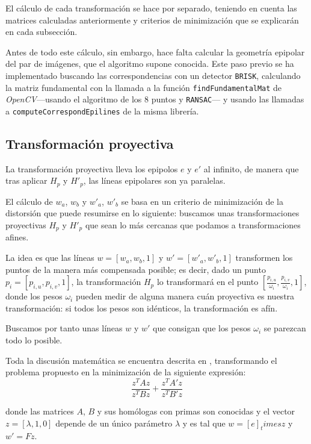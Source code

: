 \documentclass[a4paper, 11pt]{article}
\theoremstyle{definition}
\begin{document}
    El cálculo de cada transformación se hace por separado, teniendo en cuenta las matrices calculadas anteriormente y criterios de minimización que se explicarán en cada subsección.

    Antes de todo este cálculo, sin embargo, hace falta calcular la geometría epipolar del par de imágenes, que el algoritmo supone conocida. Este paso previo se ha implementado buscando las correspondencias con un detector \lstinline{BRISK}, calculando la matriz fundamental con la llamada a la función \lstinline{findFundamentalMat} de \emph{OpenCV}---usando el algoritmo de los 8 puntos y \lstinline{RANSAC}--- y usando las llamadas a \lstinline{computeCorrespondEpilines} de la misma librería.

    \subsection{Transformación proyectiva}
    La transformación proyectiva lleva los epipolos $e$ y $e'$ al infinito, de manera que tras aplicar $H_p$ y $H'_p$, las líneas epipolares son ya paralelas.

    El cálculo de $w_a$, $w_b$ y  $w'_a$, $w'_b$ se basa en un criterio de minimización de la distorsión que puede resumirse en lo siguiente: buscamos unas transformaciones proyectivas $H_p$ y $H'_p$ que sean lo más cercanas que podamos a transformaciones afines.

    La idea es que las líneas $w = [w_a, w_b, 1]$ y $w' = [w'_a, w'_b, 1]$ transformen los puntos de la manera más compensada posible; es decir, dado un punto $p_i = [p_{i,u}, p_{i,v}, 1]$, la transformación $H_p$ lo transformará en el punto $[\frac{p_{i,u}}{\omega_i}, \frac{p_{i,v}}{\omega_i}, 1]$, donde los pesos $\omega_i$ pueden medir de alguna manera cuán proyectiva es nuestra transformación: si todos los pesos son idénticos, la transformación es afín.

    Buscamos por tanto unas líneas $w$ y $w'$ que consigan que los pesos $\omega_i$ se parezcan todo lo posible.

    Toda la discusión matemática se encuentra descrita en \cite{LoopZhang}, transformando el problema propuesto en la minimización de la siguiente expresión:
    \begin{equation}
        \frac{z^TAz}{z^TBz} + \frac{z^TA'z}{z^TB'z}
        \label{eq_minz}
    \end{equation}

    donde las matrices $A$, $B$ y sus homólogas con primas son conocidas y el vector $z = [\lambda, 1, 0]$ depende de un único parámetro $\lambda$ y es tal que $w = [e]_times z$ y $w' = Fz$.
\end{document}
